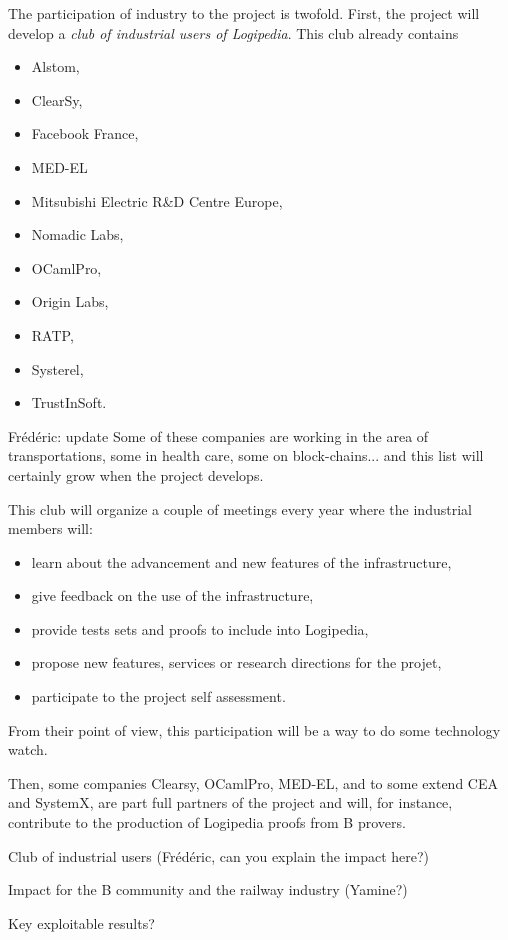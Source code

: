 The participation of industry to the project is twofold. First, the
project will develop a {\em club of industrial users of {\sf Logipedia}}.
This club already contains 
\begin{itemize}
\item Alstom,
\item ClearSy,
\item Facebook France,
\item MED-EL
\item Mitsubishi Electric R\&D Centre Europe,
\item Nomadic Labs,
\item OCamlPro,
\item Origin Labs,
\item RATP,
\item Systerel,
\item TrustInSoft.
\end{itemize}
{\color{red} Frédéric: update}
Some of these companies are working in the area
of transportations, some in health care, some on block-chains...
and this list will certainly grow when
    the project develops.

This club will 
organize a couple of meetings every year where the industrial members
will:
\begin{itemize}
\item learn about the advancement and new features of the infrastructure,
\item give feedback on the use of the infrastructure,
\item provide tests sets and proofs to include into {\sf Logipedia},
\item propose new features, services or research directions for the projet,
\item participate to the project self assessment.
\end{itemize}
From their point of view, this participation will be a
way to do some technology watch.

Then, some companies
Clearsy,
OCamlPro,
MED-EL, and to some extend CEA and SystemX, 
are part full partners of the project and will,
for instance, contribute to the production of {\sf Logipedia} proofs
from {\sf B} provers.

{\color{red} Club of industrial users (Frédéric, can 
you explain the impact here?)}

{\color{red} Impact for the {\sf B} community and the railway industry
  (Yamine?)}

{\color{red} Key exploitable results?}

